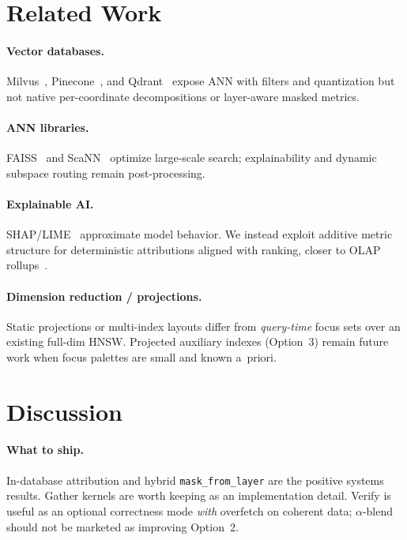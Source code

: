 \documentclass[11pt,a4paper]{article}
\begin{document}
\section{Related Work}
\label{sec:related}

\paragraph{Vector databases.}
Milvus~\cite{wang2021milvus}, Pinecone~\cite{pinecone2023}, and
Qdrant~\cite{qdrant2024} expose ANN with filters and quantization but not native
per-coordinate decompositions or layer-aware masked metrics.

\paragraph{ANN libraries.}
FAISS~\cite{johnson2019faiss} and ScaNN~\cite{guo2020scann} optimize large-scale
search; explainability and dynamic subspace routing remain post-processing.

\paragraph{Explainable AI.}
SHAP/LIME~\cite{lundberg2017shap,ribeiro2016lime} approximate model behavior.
We instead exploit additive metric structure for deterministic attributions aligned
with ranking, closer to OLAP rollups~\cite{gray1998data}.

\paragraph{Dimension reduction / projections.}
Static projections or multi-index layouts differ from \emph{query-time} focus sets
over an existing full-dim HNSW.
Projected auxiliary indexes (Option~3) remain future work when focus palettes are
small and known a~priori.

\section{Discussion}
\label{sec:discussion}

\paragraph{What to ship.}
In-database attribution and hybrid \texttt{mask\_from\_layer} are the positive
systems results.
Gather kernels are worth keeping as an implementation detail.
Verify is useful as an optional correctness mode \emph{with} overfetch on coherent
data; $\alpha$-blend should not be marketed as improving Option~2.
\end{document}
